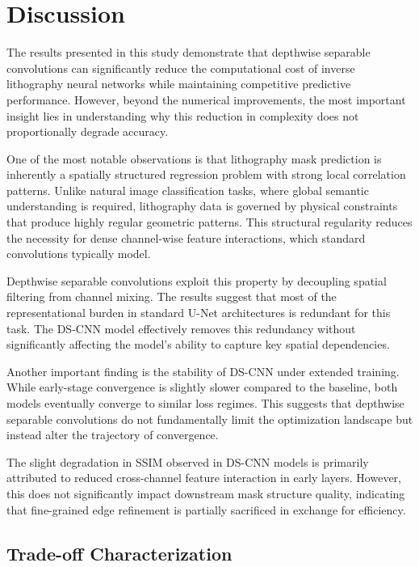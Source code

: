 \documentclass[conference]{IEEEtran}
\begin{document}
\section{\textbf{Discussion}}

The results presented in this study demonstrate that depthwise separable convolutions can significantly reduce the computational cost of inverse lithography neural networks while maintaining competitive predictive performance. However, beyond the numerical improvements, the most important insight lies in understanding why this reduction in complexity does not proportionally degrade accuracy.

One of the most notable observations is that lithography mask prediction is inherently a spatially structured regression problem with strong local correlation patterns. Unlike natural image classification tasks, where global semantic understanding is required, lithography data is governed by physical constraints that produce highly regular geometric patterns. This structural regularity reduces the necessity for dense channel-wise feature interactions, which standard convolutions typically model.

Depthwise separable convolutions exploit this property by decoupling spatial filtering from channel mixing. The results suggest that most of the representational burden in standard U-Net architectures is redundant for this task. The DS-CNN model effectively removes this redundancy without significantly affecting the model’s ability to capture key spatial dependencies.


Another important finding is the stability of DS-CNN under extended training. While early-stage convergence is slightly slower compared to the baseline, both models eventually converge to similar loss regimes. This suggests that depthwise separable convolutions do not fundamentally limit the optimization landscape but instead alter the trajectory of convergence.

The slight degradation in SSIM observed in DS-CNN models is primarily attributed to reduced cross-channel feature interaction in early layers. However, this does not significantly impact downstream mask structure quality, indicating that fine-grained edge refinement is partially sacrificed in exchange for efficiency.

\subsection{\textbf{Trade-off Characterization}}
\end{document}

